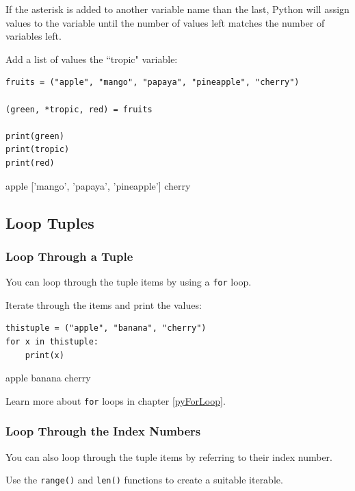 \documentclass[12pt,a4paper]{article}
\newcommand{\code}[1]{%
	\colorbox{backcolour}{\lstinline{#1}}%
}
\begin{document}
If the asterisk is added to another variable name than the last, Python will
assign values to the variable until the number of values left matches the
number of variables left.

\begin{ebox}
Add a list of values the ``tropic" variable:
	\begin{lstlisting}
fruits = ("apple", "mango", "papaya", "pineapple", "cherry")

(green, *tropic, red) = fruits

print(green)
print(tropic)
print(red)
	\end{lstlisting}
\tcblower
	\begin{vercode}
apple
['mango', 'papaya', 'pineapple']
cherry
	\end{vercode}
\end{ebox}
\subsection{Loop Tuples}

\subsubsection{Loop Through a Tuple}

You can loop through the tuple items by using a \code{for} loop.

\begin{ebox}
Iterate through the items and print the values:
	\begin{lstlisting}
thistuple = ("apple", "banana", "cherry")
for x in thistuple:
    print(x)
	\end{lstlisting}
\tcblower
	\begin{vercode}
apple
banana
cherry
	\end{vercode}
\end{ebox}

Learn more about \code{for} loops in chapter \ref{pyForLoop}.
\subsubsection{Loop Through the Index Numbers}

You can also loop through the tuple items by referring to their index number.

Use the \code{range()} and \code{len()} functions to create a suitable iterable.
\end{document}
